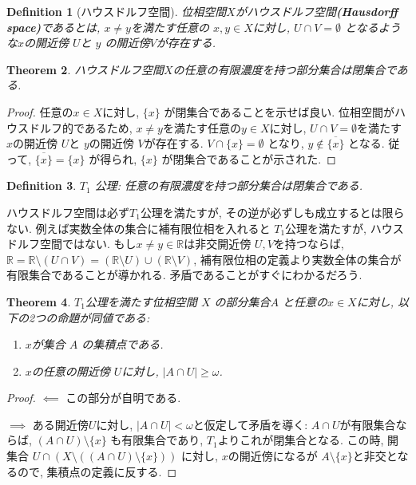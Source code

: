 \documentclass[lualatex]{ltjsbook}
\newcommand{\cl}[1]{\overline{ #1}  }
\newtheorem{theorem}{Theorem}[chapter]
\newtheorem{definition}[theorem]{Definition}
\theoremstyle{remark}
\theoremstyle{plain}
\begin{document}
\begin{definition}[ハウスドルフ空間]
	位相空間$X$がハウスドルフ空間\textbf{(Hausdorff space)}であるとは,  $x\neq y$を満たす任意の $x, y \in X$に対し,   $U \cap V = \emptyset $ となるような$x$の開近傍 $U$と $y$ の開近傍$V$が存在する.
\end{definition}

\begin{theorem}
	ハウスドルフ空間$X$の任意の有限濃度を持つ部分集合は閉集合である.
\end{theorem}

\begin{proof}
	任意の$x \in X$に対し,   $\{x\} $ が閉集合であることを示せば良い.
	位相空間がハウスドルフ的であるため,  $x \neq y$を満たす任意の$y \in X$に対し,   $U \cap V =\emptyset$を満たす $x$の開近傍 $U$と $y$の開近傍 $V$が存在する.
	$V \cap \{x\} = \emptyset $ となり,  $y \not\in \cl{\{x\} } $ となる. 
	従って, $\cl{\{x\} } = \{x\}  $ が得られ,  $\{x\} $ が閉集合であることが示された.
\end{proof}

\begin{definition}
	$T_1$ 公理: 任意の有限濃度を持つ部分集合は閉集合である.
\end{definition}

ハウスドルフ空間は必ず$T_1$公理を満たすが,  その逆が必ずしも成立するとは限らない.
例えば実数全体の集合に補有限位相を入れると $T_1$公理を満たすが,  ハウスドルフ空間ではない. 
もし$x \neq y \in \mathbb{R}$は非交開近傍 $U, V$を持つならば, 
$\mathbb{R} = \mathbb{R} \setminus \left( U \cap V \right) =\left( \mathbb{R} \setminus U \right) \cup \left( \mathbb{R} \setminus V \right) $,  補有限位相の定義より実数全体の集合が有限集合であることが導かれる.
矛盾であることがすぐにわかるだろう.

\begin{theorem}
	\label{thm: limit point}
	$T_1$公理を満たす位相空間 $X$ の部分集合$A$ と任意の$x \in X$に対し,  以下の2つの命題が同値である: 
	\begin{enumerate}
		\item $x$が集合 $A$ の集積点である.
		\item $x$の任意の開近傍 $U$に対し,   $|A\cap U| \ge \omega$.
	\end{enumerate}
\end{theorem}

\begin{proof}
	$\impliedby$ この部分が自明である.

	$\implies$ ある開近傍$U$に対し,   $ |  A \cap U | < \omega $と仮定して矛盾を導く: 
	$A\cap U$が有限集合ならば,   $\left( A \cap U \right) \setminus \{x\} $ も有限集合であり,  $T_1$よりこれが閉集合となる. 
	この時,  開集合 $U\cap \left( X \setminus \left( \left( A \cap U \right)  \setminus \{ x\} \right) \right) $ に対し,  $x $の開近傍になるが $A \setminus \{x\} $と非交となるので,  集積点の定義に反する.
\end{proof}
\end{document}
